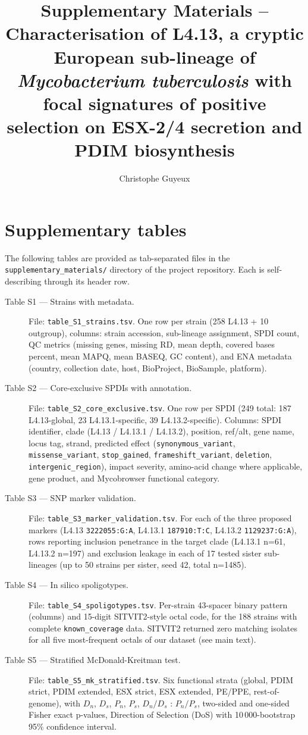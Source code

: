 \documentclass[11pt,a4paper]{article}
\title{Supplementary Materials --\\
  Characterisation of L4.13, a cryptic European sub-lineage of
  \textit{Mycobacterium tuberculosis} with focal signatures of
  positive selection on ESX-2/4 secretion and PDIM biosynthesis}
\author{Christophe Guyeux}
\date{}
\begin{document}
\maketitle

\section*{Supplementary tables}

The following tables are provided as tab-separated files in the
\texttt{supplementary\_materials/} directory of the project
repository. Each is self-describing through its header row.

\begin{description}
\item[Table S1 --- Strains with metadata.]
File: \texttt{table\_S1\_strains.tsv}.
One row per strain (258 L4.13 + 10 outgroup), columns: strain
accession, sub-lineage assignment, SPDI count, QC metrics (missing
genes, missing RD, mean depth, covered bases percent, mean MAPQ,
mean BASEQ, GC content), and ENA metadata (country, collection
date, host, BioProject, BioSample, platform).

\item[Table S2 --- Core-exclusive SPDIs with annotation.]
File: \texttt{table\_S2\_core\_exclusive.tsv}. One row per SPDI
(249 total: 187 L4.13-global, 23 L4.13.1-specific, 39
L4.13.2-specific). Columns: SPDI identifier, clade (L4.13 /
L4.13.1 / L4.13.2), position, ref/alt, gene name, locus tag,
strand, predicted effect (\texttt{synonymous\_variant},
\texttt{missense\_variant}, \texttt{stop\_gained},
\texttt{frameshift\_variant}, \texttt{deletion},
\texttt{intergenic\_region}), impact severity, amino-acid change
where applicable, gene product, and Mycobrowser functional
category.

\item[Table S3 --- SNP marker validation.]
File: \texttt{table\_S3\_marker\_validation.tsv}. For each of the
three proposed markers (L4.13 \texttt{3222055:G:A}, L4.13.1
\texttt{187910:T:C}, L4.13.2 \texttt{1129237:G:A}), rows
reporting inclusion penetrance in the target clade
(L4.13.1 n=61, L4.13.2 n=197) and exclusion leakage in each of
17 tested sister sub-lineages (up to 50 strains per sister, seed
42, total n=1485).

\item[Table S4 --- In silico spoligotypes.]
File: \texttt{table\_S4\_spoligotypes.tsv}. Per-strain 43-spacer
binary pattern (columns) and 15-digit SITVIT2-style octal code,
for the 188 strains with complete \texttt{known\_coverage} data.
SITVIT2 returned zero matching isolates for all five
most-frequent octals of our dataset (see main text).

\item[Table S5 --- Stratified McDonald-Kreitman test.]
File: \texttt{table\_S5\_mk\_stratified.tsv}. Six functional
strata (global, PDIM strict, PDIM extended, ESX strict, ESX
extended, PE/PPE, rest-of-genome), with $D_{n}$, $D_{s}$,
$P_{n}$, $P_{s}$, $D_{n}/D_{s}$ : $P_{n}/P_{s}$, two-sided and
one-sided Fisher exact p-values, Direction of Selection (DoS)
with 10\,000-bootstrap 95\% confidence interval.
\end{description}
\end{document}
